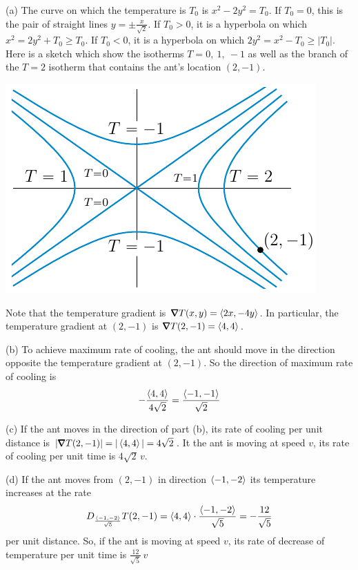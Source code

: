 \begin{solution}
(a) The curve on which the temperature is $T_0$ is $x^2-2y^2=T_0$.
If $T_0=0$, this is the pair of straight lines $y=\pm\frac{x}{\sqrt{2}}$.
If $T_0>0$, it is a hyperbola on which $x^2=2y^2+T_0\ge T_0$.
If $T_0<0$, it is a hyperbola on which $2y^2=x^2-T_0\ge |T_0|$.
Here is a sketch which show the isotherms $T=0,\ 1,\ -1$ as well
as the branch of the $T=2$ isotherm that contains the ant's location
$(2,-1)$.
\begin{center}
     \includegraphics{fig/ant.pdf}
\end{center}
Note that the temperature gradient is $\vnabla T(x,y)=\llt 2x,-4y\rgt$.
In particular, the temperature gradient at $(2,-1)$
is $\vnabla T(2,-1)=\llt 4,4\rgt$.

(b) To achieve maximum rate of cooling, the ant should move in the direction
opposite the temperature gradient at $(2,-1)$. So the direction of
maximum rate of cooling is 
\begin{equation*}
-\frac{\left< 4,4\right>}{4\sqrt{2}}
    =\frac{\left< -1,-1\right>}{\sqrt{2}}
\end{equation*}

(c) If the ant moves in the direction of part (b), its rate of cooling
per unit distance is $|\vnabla T(2,-1)|=|\llt 4,4\rgt| = 4\sqrt{2}$.
It the ant is moving at speed $v$, its rate of cooling
per unit time is $4\sqrt{2}\,v$.

(d) If the ant moves from $(2,-1)$  in direction $\left< -1,-2\right>$
its temperature increases at the rate 
\begin{equation*}
  D_{\frac{\left< -1,-2\right>}{\sqrt{5}}} T(2,-1)
        = \left< 4,4\right>\cdot \frac{\left< -1,-2\right>}{\sqrt{5}}
        = -\frac{12}{\sqrt{5}}
\end{equation*}
per unit distance. So, if the ant is moving at speed $v$,
its rate of decrease of temperature per unit time
is $\frac{12}{\sqrt{5}}\,v$




\end{solution}
